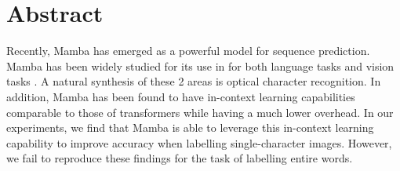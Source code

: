 \section{Abstract}
Recently, Mamba has emerged as a powerful model for sequence prediction.
Mamba has been widely studied for its use in for both language tasks\cite{mamba}
\cite{mambalang} and vision tasks\cite{medmamba} \cite{vmamba}.
A natural synthesis of these 2 areas is optical character recognition.
In addition, Mamba has been found to have in-context learning capabilities
comparable to those of transformers while having a much lower
overhead\cite{mambaicl}.
In our experiments, we find that Mamba is able to leverage this in-context
learning capability to improve accuracy when labelling single-character images.
However, we fail to reproduce these findings for the task of labelling entire
words.
